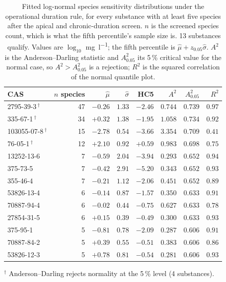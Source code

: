 \begin{table}[htbp]\centering\scriptsize\setlength{\tabcolsep}{2.4pt}
\caption{Fitted log-normal species sensitivity distributions under the operational duration rule, for every substance with at least five species after the apical and chronic-duration screen. $n$ is the screened species count, which is what the fifth percentile's sample size is. 13 substances qualify. Values are $\log_{10}$ \si{\milli\gram\per\litre}; the fifth percentile is $\hat\mu + z_{0.05}\hat\sigma$. $A^2$ is the Anderson--Darling statistic and $A^2_{0.05}$ its 5\,\% critical value for the normal case, so $A^2 > A^2_{0.05}$ is a rejection; $R^2$ is the squared correlation of the normal quantile plot.}
\label{tab:fit}
\begin{tabular}{@{}l r r r r r r r@{}}\toprule
CAS & $n$ species & $\hat\mu$ & $\hat\sigma$ & HC5 & $A^2$ & $A^2_{0.05}$ & $R^2$ \\\midrule
2795-39-3\,$^{\dagger}$ & 47 & $-0.26$ & $1.33$ & $-2.46$ & $0.744$ & $0.739$ & $0.97$ \\
335-67-1\,$^{\dagger}$ & 34 & $+0.32$ & $1.38$ & $-1.95$ & $1.058$ & $0.734$ & $0.92$ \\
103055-07-8\,$^{\dagger}$ & 15 & $-2.78$ & $0.54$ & $-3.66$ & $3.354$ & $0.709$ & $0.41$ \\
76-05-1\,$^{\dagger}$ & 12 & $+2.10$ & $0.92$ & $+0.59$ & $0.983$ & $0.698$ & $0.75$ \\
13252-13-6 & 7 & $-0.59$ & $2.04$ & $-3.94$ & $0.293$ & $0.652$ & $0.94$ \\
375-73-5 & 7 & $-0.42$ & $2.91$ & $-5.20$ & $0.343$ & $0.652$ & $0.93$ \\
355-46-4 & 7 & $-0.21$ & $1.12$ & $-2.06$ & $0.451$ & $0.652$ & $0.89$ \\
53826-13-4 & 6 & $-0.14$ & $0.87$ & $-1.57$ & $0.350$ & $0.633$ & $0.91$ \\
70887-94-4 & 6 & $-0.02$ & $0.44$ & $-0.75$ & $0.627$ & $0.633$ & $0.78$ \\
27854-31-5 & 6 & $+0.15$ & $0.39$ & $-0.49$ & $0.300$ & $0.633$ & $0.93$ \\
375-95-1 & 5 & $-0.81$ & $0.78$ & $-2.09$ & $0.287$ & $0.606$ & $0.91$ \\
70887-84-2 & 5 & $+0.39$ & $0.55$ & $-0.51$ & $0.383$ & $0.606$ & $0.86$ \\
53826-12-3 & 5 & $+0.78$ & $0.81$ & $-0.54$ & $0.281$ & $0.606$ & $0.93$ \\
\bottomrule\end{tabular}

\footnotesize $^{\dagger}$ Anderson--Darling rejects normality at the 5\,\% level (4 substances).
\end{table}
